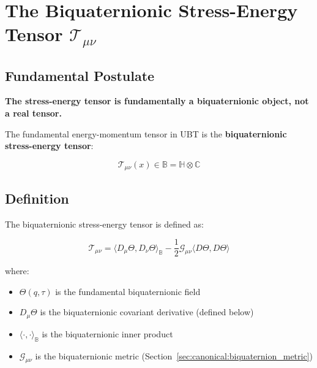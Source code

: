 

\section{The Biquaternionic Stress-Energy Tensor $\mathcal{T}_{\mu\nu}$}
\label{sec:canonical:biquaternion_stress_energy}

\subsection{Fundamental Postulate}

\textbf{The stress-energy tensor is fundamentally a biquaternionic object, not a real tensor.}

The fundamental energy-momentum tensor in UBT is the \textbf{biquaternionic stress-energy tensor}:

\begin{equation}
\label{eq:canonical:biq_stress_fundamental}
\boxed{\mathcal{T}_{\mu\nu}(x) \in \mathbb{B} = \mathbb{H} \otimes \mathbb{C}}
\end{equation}

\subsection{Definition}

The biquaternionic stress-energy tensor is defined as:

\begin{equation}
\label{eq:canonical:biq_stress_definition}
\boxed{\mathcal{T}_{\mu\nu} = \langle D_\mu \Theta, D_\nu \Theta \rangle_\mathbb{B} - \frac{1}{2} \mathcal{G}_{\mu\nu} \langle D\Theta, D\Theta \rangle}
\end{equation}

\noindent where:
\begin{itemize}
    \item $\Theta(q,\tau)$ is the fundamental biquaternionic field
    \item $D_\mu \Theta$ is the biquaternionic covariant derivative (defined below)
    \item $\langle \cdot, \cdot \rangle_\mathbb{B}$ is the biquaternionic inner product
    \item $\mathcal{G}_{\mu\nu}$ is the biquaternionic metric (Section~\ref{sec:canonical:biquaternion_metric})
\end{itemize}

